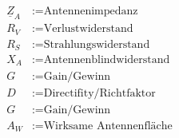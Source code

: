 \begin{center}
\end{center}\vspace{-1ex}
\small
\begin{align*}
    \underline{Z}_A & := \text{Antennenimpedanz}        \\
    R_V             & := \text{Verlustwiderstand}       \\
    R_S             & := \text{Strahlungswiderstand}    \\
    X_A             & := \text{Antennenblindwiderstand} \\
    G               & := \text{Gain/Gewinn}             \\
    D               & := \text{Directifity/Richtfaktor} \\
    G               & := \text{Gain/Gewinn}             \\
    A_W             & := \text{Wirksame Antennenfläche} \\
\end{align*}
\normalsize
